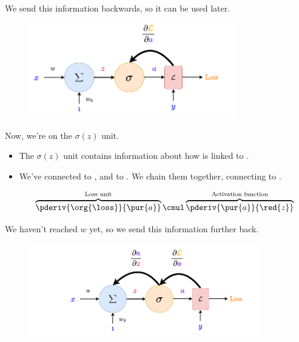         We send this information backwards, so it can be used later.

        \begin{figure}[H]
            \centering
            \includegraphics[width=90mm,scale=0.4]{images/nn_2_images/llc_backprop_1.png}
        \end{figure}

        Now, we're on the $\sigma(z)$ unit.

        \begin{itemize}
            \item The $\sigma(z)$ unit contains information about how  is linked to .

            \item We've connected \org{$\loss$} to , and  to . We chain them together, connecting \org{$\loss$} to .

                \begin{equation}
                    \overbrace{
                        \pderiv {\org{\loss}} {\pur{a}} 
                    }^{\text{Loss unit}}
                    \cmul
                    \overbrace{
                        \pderiv {\pur{a}}     {\red{z}}
                    }^{\text{Activation function}}
                \end{equation}
        \end{itemize}
        
        We haven't reached $w$ yet, so we send this information further back.
        
        \begin{figure}[H]
            \centering
            \includegraphics[width=100mm,scale=0.4]{images/nn_2_images/llc_backprop_2.png}
        \end{figure}

